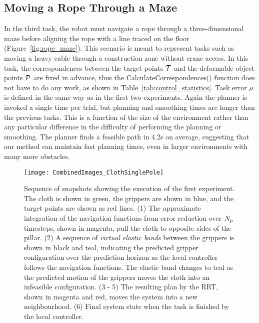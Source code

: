 \subsection{Moving a Rope Through a Maze}
\label{sec:rope_maze}
In the third task, the robot must navigate a rope through a three-dimensional maze before aligning the rope with a line traced on the floor (Figure~\ref{fig:rope_maze}). This scenario is meant to represent tasks such as moving a heavy cable through a construction zone without crane access. In this task, the correspondences between the target points $\mathcal{T}$ and the deformable object points $\mathcal{P}$ are fixed in advance, thus the CalculateCorrespondences() function does not have to do any work, as shown in Table~\ref{tab:control_statistics}. Task error $\rho$ is defined in the same way as in the first two experiments. Again the planner is invoked a single time per trial, but planning and smoothing times are longer than the previous tasks. This is a function of the size of the environment rather than any particular difference in the difficulty of performing the planning or smoothing. The planner finds a feasible path in 4.2s on average, suggesting that our method can maintain fast planning times, even in larger environments with many more obstacles.


\begin{figure*}[ht]
    \centering
    \texttt{[image: CombinedImages\_ClothSinglePole]}
    \vspace{-0.2in}
    \caption{Sequence of snapshots showing the execution of the first experiment. The cloth is shown in green, the grippers are shown in blue, and the target points are shown as red lines. (1) The approximate integration of the navigation functions from error reduction over $N_p$ timesteps, shown in magenta, pull the cloth to opposite sides of the pillar. (2) A sequence of \textit{virtual elastic bands} between the grippers is shown in black and teal, indicating the predicted gripper configuration over the prediction horizon as the local controller follows the navigation functions. The elastic band changes to teal as the predicted motion of the grippers moves the cloth into an infeasible configuration. (3 - 5) The resulting plan by the RRT, shown in magenta and red, moves the system into a new neighbourhood. (6) Final system state when the task is finished by the local controller.}
    \label{fig:cloth_single_pole}
\end{figure*}

